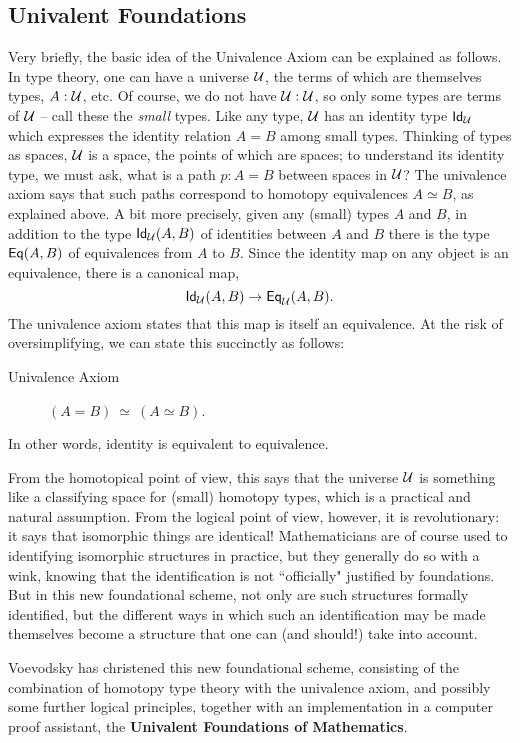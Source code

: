 {\subsection*{Univalent Foundations}

Very briefly, the basic idea of the Univalence Axiom can be explained as follows.  In type theory, one can have a universe ${\mathcal U}$, the terms of which are themselves types, $A : {\mathcal U}$, etc.  Of course, we do not have ${\mathcal U}:{\mathcal U}$, so only some types are terms of ${\mathcal U}$ -- call these the \emph{small} types.  Like any type, ${\mathcal U}$ has an identity type ${{\sf Id}}_{{\mathcal U}}$ which expresses the identity relation $A = B$ among small types.  Thinking of  types as spaces, ${\mathcal U}$ is a space, the points of which are spaces; to understand its identity type, we must ask, what is a path $p : A = B$ between spaces in ${\mathcal U}$?  The univalence axiom says that such paths correspond to homotopy equivalences $A\simeq B$, as explained above.  A bit more precisely, given any (small) types $A$ and $B$, in addition to the type ${{\sf Id}}_{{\mathcal U}}(A,B)$ of identities between $A$ and $B$ there is the type ${{\sf Eq}}(A,B)$ of equivalences from $A$ to $B$.  Since the identity map on any object is an equivalence, there is a canonical map,
$${{\sf Id}}_{{\mathcal U}}(A,B)\to{{\sf Eq}}_{{\mathcal U}}(A,B).$$
The univalence axiom states that this map is itself an equivalence.  At the risk of oversimplifying, we can state this succinctly as follows:

\begin{description}
\item[Univalence Axiom]  $(A = B)\ \simeq\ (A\simeq B)$.
\end{description}
%
In other words, identity is equivalent to equivalence. 

From the homotopical point of view, this says that the universe ${\mathcal U}$ is something like a classifying space for (small) homotopy types, which is a practical and natural assumption.  From the  logical point of view, however, it is revolutionary: it says that isomorphic things are identical!  Mathematicians are of course used to identifying isomorphic structures in practice, but they generally do so with a wink, knowing that the identification is not ``officially" justified by foundations.  But in this new foundational scheme, not only are such structures formally identified, but the different ways in which such an identification may be made themselves become a structure that one can (and should!) take into account.

Voevodsky has christened this new foundational scheme, consisting of the combination of homotopy type theory with the univalence axiom, and possibly some further logical principles, together with an implementation in a computer proof assistant, the {\bf Univalent Foundations of Mathematics}.

}
